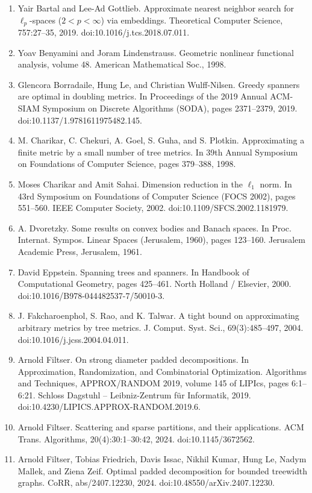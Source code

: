 \begin{enumerate}
\item[]  [10]  Yair Bartal and Lee-Ad Gottlieb.  Approximate nearest neighbor search for $\ell_{p}$-spaces ($2<p<\infty$) via embeddings.  Theoretical Computer Science, 757:27–35, 2019.  doi:10.1016/j.tcs.2018.07.011.  
\item[]  [11]  Yoav Benyamini and Joram Lindenstrauss.  Geometric nonlinear functional analysis, volume 48.  American Mathematical Soc., 1998.  
\item[]  [12]  Glencora Borradaile, Hung Le, and Christian Wulff-Nilsen.  Greedy spanners are optimal in doubling metrics.  In Proceedings of the 2019 Annual ACM-SIAM Symposium on Discrete Algorithms (SODA), pages 2371–2379, 2019.  doi:10.1137/1.9781611975482.145.  
\item[]  [13]  M. Charikar, C. Chekuri, A. Goel, S. Guha, and S. Plotkin.  Approximating a finite metric by a small number of tree metrics.  In 39th Annual Symposium on Foundations of Computer Science, pages 379–388, 1998.  
\item[]  [14]  Moses Charikar and Amit Sahai.  Dimension reduction in the $\ell_{1}$ norm.  In 43rd Symposium on Foundations of Computer Science (FOCS 2002), pages 551–560. IEEE Computer Society, 2002.  doi:10.1109/SFCS.2002.1181979.  
\item[]  [15]  A. Dvoretzky.  Some results on convex bodies and Banach spaces.  In Proc. Internat. Sympos. Linear Spaces (Jerusalem, 1960), pages 123–160. Jerusalem Academic Press, Jerusalem, 1961.  
\item[]  [16]  David Eppstein.  Spanning trees and spanners.  In Handbook of Computational Geometry, pages 425–461. North Holland / Elsevier, 2000.  doi:10.1016/B978-044482537-7/50010-3.  
\item[]  [17]  J. Fakcharoenphol, S. Rao, and K. Talwar.  A tight bound on approximating arbitrary metrics by tree metrics.  J. Comput. Syst. Sci., 69(3):485–497, 2004.  doi:10.1016/j.jcss.2004.04.011.  
\item[]  [18]  Arnold Filtser.  On strong diameter padded decompositions.  In Approximation, Randomization, and Combinatorial Optimization. Algorithms and Techniques, APPROX/RANDOM 2019, volume 145 of LIPIcs, pages 6:1–6:21. Schloss Dagstuhl – Leibniz-Zentrum für Informatik, 2019.  doi:10.4230/LIPICS.APPROX-RANDOM.2019.6.  
\item[]  [19]  Arnold Filtser.  Scattering and sparse partitions, and their applications.  ACM Trans. Algorithms, 20(4):30:1–30:42, 2024.  doi:10.1145/3672562.  
\item[]  [20]  Arnold Filtser, Tobias Friedrich, Davis Issac, Nikhil Kumar, Hung Le, Nadym Mallek, and Ziena Zeif.  Optimal padded decomposition for bounded treewidth graphs.  CoRR, abs/2407.12230, 2024.  doi:10.48550/arXiv.2407.12230.  

\end{enumerate}
